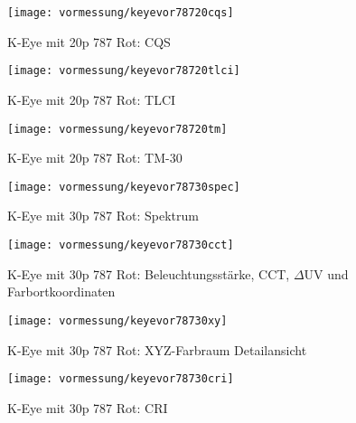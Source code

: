 \documentclass[pagesize,paper=A4,fontsize=12pt,utf8,numbers=noenddot,bibliography=totoc,listof=totoc,DIV=11,BCOR=1mm]{scrreprt}
\begin{document}
\begin{figure}[htp]     %
\centering
\texttt{[image: vormessung/keyevor78720cqs]} 
\caption {K-Eye mit 20p 787 Rot: CQS} 
\end{figure}

\begin{figure}[htp]     %
\centering
\texttt{[image: vormessung/keyevor78720tlci]} 
\caption {K-Eye mit 20p 787 Rot: TLCI} 
\end{figure}

\begin{figure}[htp]     %
\centering
\texttt{[image: vormessung/keyevor78720tm]} 
\caption {K-Eye mit 20p 787 Rot: TM-30} 
\end{figure}



\begin{figure}[htp]     %
\centering
\texttt{[image: vormessung/keyevor78730spec]} 
\caption {K-Eye mit 30p 787 Rot: Spektrum} 
\end{figure}

\begin{figure}[htp]     %
\centering
\texttt{[image: vormessung/keyevor78730cct]} 
\caption {K-Eye mit 30p 787 Rot: Beleuchtungsstärke, CCT, $\Delta$UV und Farbortkoordinaten} 
\end{figure}

\begin{figure}[htp]     %
\centering
\texttt{[image: vormessung/keyevor78730xy]} 
\caption {K-Eye mit 30p 787 Rot: XYZ-Farbraum Detailansicht} 
\end{figure}

\begin{figure}[htp]     %
\centering
\texttt{[image: vormessung/keyevor78730cri]} 
\caption {K-Eye mit 30p 787 Rot: CRI} 
\end{figure}
\end{document}
